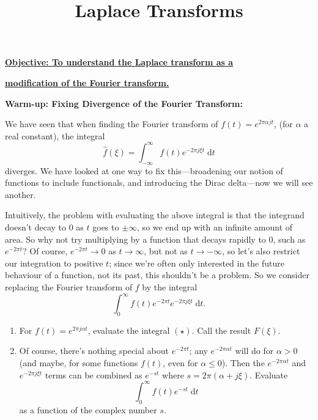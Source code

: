 \documentclass{article}
\newcommand{\diff}{\;\mathrm{d}}
\begin{document}
\title{Laplace Transforms}
\date{}

\maketitle
\thispagestyle{empty}

\Large

\vskip -10mm

\textbf{\underline{Objective: To understand the Laplace transform as a}}

\textbf{\underline{modification of the Fourier transform.}}








\vspace{5mm}





\textbf{Warm-up: Fixing Divergence of the Fourier Transform:}\bigskip


We have seen that when finding the Fourier transform of $f(t)=e^{2\pi \alpha jt}$, (for $\alpha$ a real constant), the integral
\[\hat{f}(\xi)=\int_{-\infty}^\infty f(t)e^{-2\pi j\xi t}\diff t\]
diverges. We have looked at one way to fix this---broadening our notion of functions to include functionals, and introducing the Dirac delta---now we will see another.

Intuitively, the problem with evaluating the above integral is that the integrand doesn't decay to 0 as $t$ goes to $\pm \infty$, so we end up with an infinite amount of area. So why not try multiplying by a function that decays rapidly to 0, such as $e^{-2\pi t}$? Of course, $e^{-2\pi t}\to 0$ as $t\to\infty$, but not as $t\to-\infty$, so let's also restrict our integration to positive $t$; since we're often only interested in the future behaviour of a function, not its past, this shouldn't be a problem. So we consider replacing the Fourier transform of $f$ by the integral
\begin{equation*}
	\int_0^\infty f(t)e^{-2\pi t}e^{-2\pi j\xi t}\diff t. \tag{$\star$}
\end{equation*}

\begin{enumerate}
	\item For $f(t)=e^{2\pi j\alpha t}$, evaluate the integral $(\star)$. Call the result $F(\xi)$.
	\item Of course, there's nothing special about $e^{-2\pi t}$; any $e^{-2\pi\alpha t}$ will do for $\alpha>0$ (and maybe, for some functions $f(t)$, even for $\alpha\leq 0$). Then the $e^{-2\pi \alpha t}$ and $e^{-2\pi j\xi t}$ terms can be combined as $e^{-st}$ where $s=2\pi(\alpha+j\xi)$. Evaluate
		\[\int_0^\infty f(t)e^{-st}\diff t\]
		as a function of the complex number $s$.
\end{enumerate}
\end{document}
